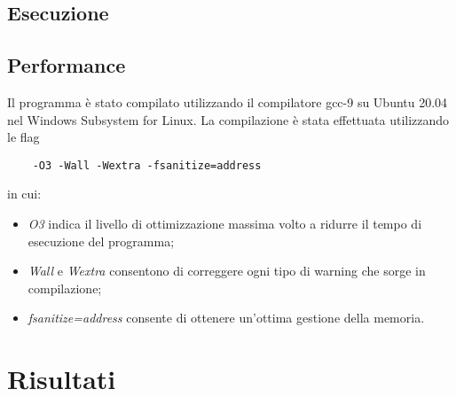 \documentclass[12pt,a4paper]{report}
\begin{document}
\section{Esecuzione}

\section{Performance}
Il programma è stato compilato utilizzando il compilatore gcc-9 su Ubuntu 20.04 nel Windows Subsystem for Linux.
La compilazione è stata effettuata utilizzando le flag
\begin{verbatim}
    -O3 -Wall -Wextra -fsanitize=address
\end{verbatim}
in cui:
\begin{itemize}
    \item \emph{O3} indica il livello di ottimizzazione massima volto a ridurre il tempo di esecuzione del programma;
    \item \emph{Wall} e \emph{Wextra} consentono di correggere ogni tipo di warning che sorge in compilazione;
    \item \emph{fsanitize=address} consente di ottenere un'ottima gestione della memoria.
\end{itemize}


\chapter{Risultati}

\printbibliography
\end{document}
